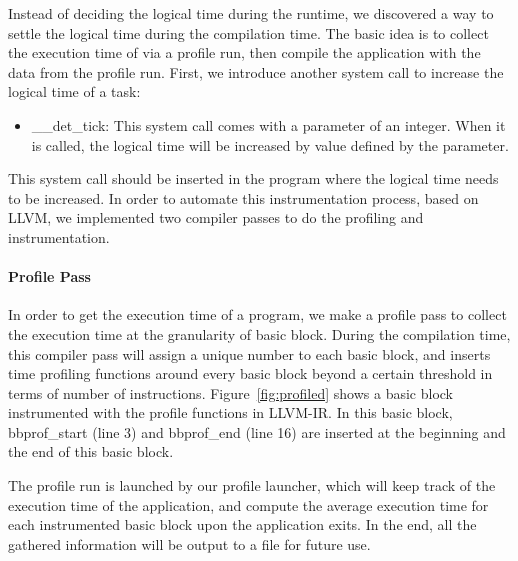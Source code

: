 Instead of deciding the logical time during the runtime, we discovered a way to settle the logical time during the compilation time. The basic idea is to collect the execution time of via a profile run, then compile the application with the data from the profile run. First, we introduce another system call to increase the logical time of a task:

\begin{itemize}
   \item \_\_det\_tick: This system call comes with a parameter of an integer. When it is called, the logical time will be increased by value defined by the parameter.
\end{itemize}

This system call should be inserted in the program where the logical time needs to be increased. In order to automate this instrumentation process, based on LLVM, we implemented two compiler passes to do the profiling and instrumentation.

\paragraph{Profile Pass}
In order to get the execution time of a program, we make a profile pass to collect the execution time at the granularity of basic block. During the compilation time, this compiler pass will assign a unique number to each basic block, and inserts time profiling functions around every basic block beyond a certain threshold in terms of number of instructions. Figure~\ref{fig:profiled} shows a basic block instrumented with the profile functions in LLVM-IR. In this basic block, bbprof\_start (line 3) and bbprof\_end (line 16) are inserted at the beginning and the end of this basic block.

The profile run is launched by our profile launcher, which will keep track of the execution time of the application, and compute the average execution time for each instrumented basic block upon the application exits. In the end, all the gathered information will be output to a file for future use.

